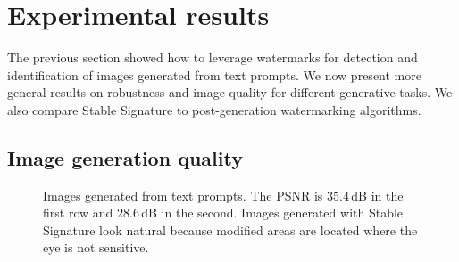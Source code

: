 
\section{Experimental results}\label{chap3/sec:experiments}

The previous section showed how to leverage watermarks for detection and identification of images generated from text prompts.
We now present more general results on robustness and image quality for different generative tasks.
We also compare Stable Signature to post-generation watermarking algorithms.




\subsection{Image generation quality}

\begin{figure}[b!]
    \centering
    \setlength{\tabcolsep}{0pt}
    \caption{
    Images generated from text prompts. 
    The PSNR is $35.4$\,dB in the first row and $28.6$\,dB in the second.
    Images generated with Stable Signature look natural because modified areas are located where the eye is not sensitive.
    }
    \label{chap3/fig:qualitative}
\end{figure}

